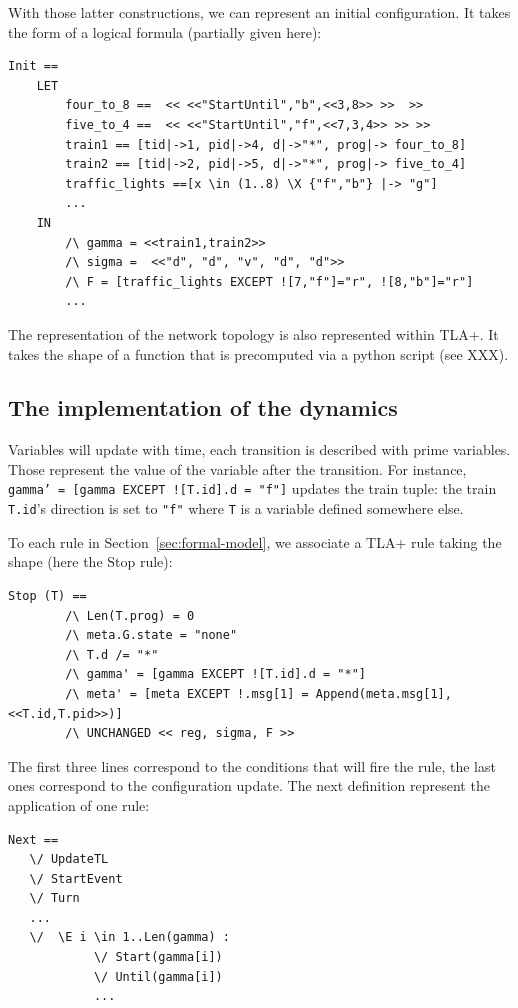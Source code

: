 \documentclass[runningheads]{llncs}
\begin{document}
With those latter constructions, we can represent an initial configuration. It takes the form of a logical formula (partially given here):
\begin{verbatim}
Init == 
    LET 
        four_to_8 ==  << <<"StartUntil","b",<<3,8>> >>  >>
        five_to_4 ==  << <<"StartUntil","f",<<7,3,4>> >> >>
        train1 == [tid|->1, pid|->4, d|->"*", prog|-> four_to_8]
        train2 == [tid|->2, pid|->5, d|->"*", prog|-> five_to_4]
        traffic_lights ==[x \in (1..8) \X {"f","b"} |-> "g"]
        ...
    IN
        /\ gamma = <<train1,train2>>
        /\ sigma =  <<"d", "d", "v", "d", "d">> 
        /\ F = [traffic_lights EXCEPT ![7,"f"]="r", ![8,"b"]="r"]
        ...
\end{verbatim}

The representation of the network topology is also represented within TLA+. It takes the shape of a function that is precomputed via a python script (see XXX). 

\subsection{The implementation of the dynamics}

Variables will update with time, each transition is described with prime variables. Those represent the value of the variable after the transition. For instance, \texttt{gamma' = [gamma EXCEPT ![T.id].d = "f"]} updates the train tuple: the train \texttt{T.id}'s direction is set to \texttt{"f"} where  \texttt{T} is a variable  defined somewhere else. 

To each rule in Section~\ref{sec:formal-model}, we associate a TLA+ rule taking the shape (here the Stop rule): 
\begin{verbatim}
Stop (T) ==
        /\ Len(T.prog) = 0
        /\ meta.G.state = "none"
        /\ T.d /= "*"
        /\ gamma' = [gamma EXCEPT ![T.id].d = "*"]
        /\ meta' = [meta EXCEPT !.msg[1] = Append(meta.msg[1],<<T.id,T.pid>>)]
        /\ UNCHANGED << reg, sigma, F >>
 \end{verbatim}
The first three lines correspond to the conditions that will fire the rule, the last ones correspond to the configuration update. The next definition represent the application of one rule:
\begin{verbatim}
Next == 
   \/ UpdateTL
   \/ StartEvent
   \/ Turn
   ...
   \/  \E i \in 1..Len(gamma) :
            \/ Start(gamma[i])
            \/ Until(gamma[i])
            ...
\end{verbatim}       
        
\end{document}

